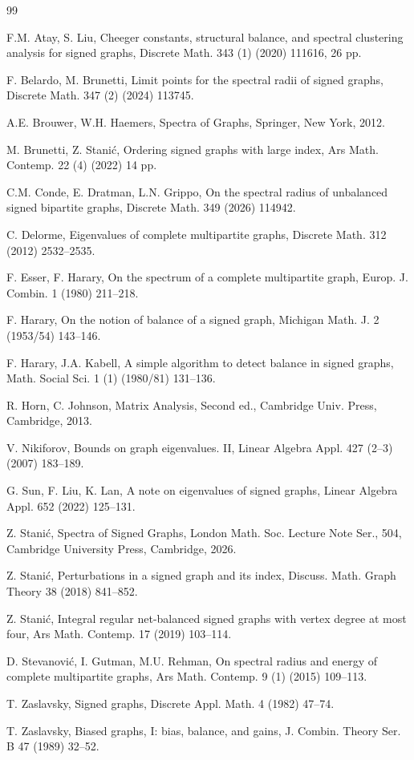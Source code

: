 \documentclass[12pt]{article}
\numberwithin{equation}{section}
\begin{document}
\begin{thebibliography}{99}

  F.M. Atay, S. Liu, 
Cheeger constants, structural balance, and spectral clustering analysis for signed graphs,
Discrete Math. 343 (1) (2020)  111616, 26 pp.

 F. Belardo, M. Brunetti, Limit points for the spectral radii of signed graphs, Discrete Math. 347 (2) (2024) 113745.

A.E. Brouwer, W.H. Haemers, Spectra of Graphs,  Springer, New York, 2012.


M. Brunetti, Z. Stani\'c, Ordering signed graphs with large index,
Ars Math. Contemp. 22 (4) (2022)  14 pp.

C.M. Conde,  E. Dratman, L.N. Grippo,
On the spectral radius of unbalanced signed bipartite graphs,
Discrete Math. 349 (2026) 114942.

 C. Delorme, 
Eigenvalues of complete multipartite graphs, Discrete Math. 312 (2012) 2532--2535.

F. Esser, F. Harary, 
On the spectrum of a complete multipartite graph, 
Europ. J. Combin. 1 (1980) 211--218. 

 F. Harary, 
On the notion of balance of a signed graph,
Michigan Math. J. 2 (1953/54)  143--146.

 F. Harary, J.A. Kabell, 
A simple algorithm to detect balance in signed graphs, 
Math. Social Sci. 1 (1) (1980/81) 131--136.  

R. Horn, C. Johnson, Matrix Analysis, Second ed., 
Cambridge Univ. Press, Cambridge, 2013. 

 V. Nikiforov, 
Bounds on graph eigenvalues. II,
Linear Algebra Appl. 427 (2--3) (2007) 183--189.

G. Sun, F. Liu, K. Lan,
A note on eigenvalues of signed graphs,
Linear Algebra Appl. 652 (2022) 125--131.


 Z. Stani\'c, Spectra of Signed Graphs, 
London Math. Soc. Lecture Note Ser., 504, 
Cambridge University Press, Cambridge, 2026.

Z. Stani\'c, Perturbations in a signed graph and its index, Discuss. Math. Graph Theory 38
(2018) 841--852.


Z. Stani\'c, Integral regular net-balanced signed graphs with vertex degree at most four, Ars Math. Contemp. 17 (2019) 103--114.

 D. Stevanovi\'c, I.  Gutman,  M.U. Rehman, 
On spectral radius and energy of complete multipartite graphs,
Ars Math. Contemp. 9 (1) (2015) 109--113.


T. Zaslavsky,
Signed graphs,
Discrete Appl. Math. 4 (1982) 47--74.


 T. Zaslavsky, Biased graphs, I: bias, balance, and gains, J. Combin. Theory Ser. B 47 (1989) 32--52.



\end{thebibliography}
\end{document}
